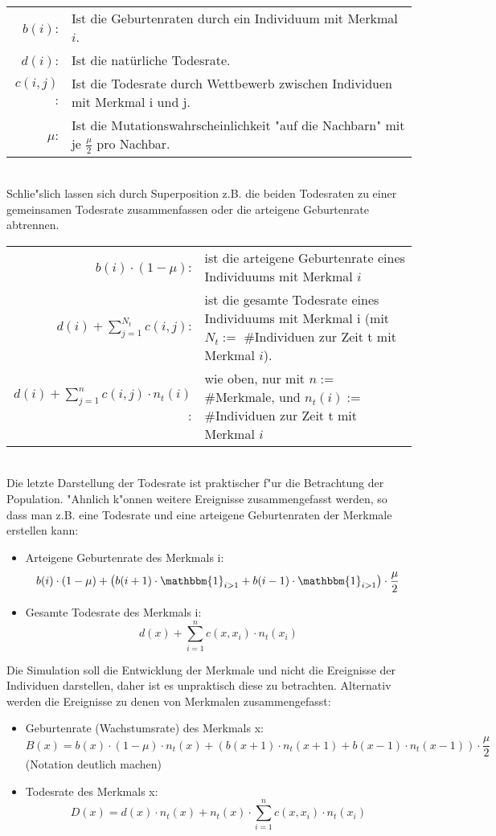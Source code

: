 \documentclass[11pt, a4paper, german]{article}
\begin{document}
	\begin{tabular}{r p{26em}}
		$ b(i) $: & Ist die Geburtenraten durch ein Individuum mit Merkmal $ i $.\\
		$ d(i) $: & Ist die natürliche Todesrate.\\
		$ c(i, j) $: & Ist die Todesrate durch Wettbewerb zwischen Individuen mit Merkmal i und j.\\
		$ \mu $: & Ist die Mutationswahrscheinlichkeit "{}auf die Nachbarn"{} mit je $ \frac{\mu}{2} $ pro Nachbar. \\
	\end{tabular}\\

	Schlie"slich lassen sich durch Superposition z.B. die beiden Todesraten zu einer gemeinsamen Todesrate zusammenfassen oder die arteigene Geburtenrate abtrennen.\\
	
	\begin{tabular}{ r p{18em} }
		$ b(i) \cdot (1 - \mu) $: & ist die arteigene Geburtenrate eines Individuums mit Merkmal $ i $\\
		$ d(i) + \sum_{j=1}^{N_t} c(i, j) $: & ist die gesamte Todesrate eines Individuums mit Merkmal i (mit $ N_t := $ \#Individuen zur Zeit t mit Merkmal $ i $).\\
		$ d(i) + \sum_{j=1}^{n} c(i,j) \cdot n_t(i) $: & wie oben, nur mit $ n := $ \#Merkmale, und $ n_t(i) :=$ \#Individuen zur Zeit t mit Merkmal $ i $
	\end{tabular}\\
	
	Die letzte Darstellung der Todesrate ist praktischer f"ur die Betrachtung der Population. "Ahnlich k"onnen weitere Ereignisse zusammengefasst werden, so dass man z.B. eine Todesrate und eine arteigene Geburtenraten der Merkmale erstellen kann:

	\begin{itemize}
	 	\item Arteigene Geburtenrate des Merkmals i: 
	 	\[ b(i) \cdot (1 - \mu) + \left( b(i+1) \cdot \mathbbm{1}_{i>1} + b(i-1) \cdot \mathbbm{1}_{i>1} \right) \cdot \frac{\mu}{2} \] 
	 	\item Gesamte Todesrate des Merkmals i: 
	 	\[ d(x) + \sum_{i=1}^{n} c(x,x_i) \cdot n_t(x_i) \]
	\end{itemize}
	
	Die Simulation soll die Entwicklung der Merkmale und nicht die Ereignisse der Individuen darstellen, daher ist es unpraktisch diese zu betrachten. Alternativ werden die Ereignisse zu denen von Merkmalen zusammengefasst:
	\begin{itemize}
		\item Geburtenrate (Wachstumsrate) des Merkmals x: \[ B(x) = b(x) \cdot (1 - \mu) \cdot n_t(x) + (b(x+1)\cdot n_t(x+1) + b(x-1)\cdot n_t(x-1)) \cdot \frac{\mu}{2} \]
		(Notation deutlich machen)
		\item Todesrate des Merkmals x: 
		\[ D(x) = d(x) \cdot n_t(x) + n_t(x) \cdot \sum_{i=1}^{n} c(x,x_i) \cdot n_t(x_i) \]
	\end{itemize}
	
\end{document}

